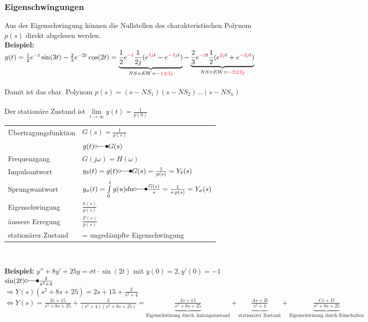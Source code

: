 		\subsubsection{Eigenschwingungen}
			Aus der Eigenschwingung können die Nullstellen des charakteristischen Polynom $p(s)$ 
			direkt abgelesen werden. \\
			\textbf{Beispiel:} \\
			$y(t) = \frac{1}{2} e^{-t} \sin(3t) - \frac{2}{3} e^{-2t} \cos(2t) = 
			\underbrace{\frac{1}{2} e^{\textcolor{red}{-t}} \frac{1}{2j}(e^{\textcolor{red}{3j}t}
			-e^{\textcolor{red}{-3j}t})}_{NS = EW = \textcolor{red}{-1 \pm 3j}} - 
			\underbrace{\frac{2}{3} e^{\textcolor{red}{-2}t} \frac{1}{2}(e^{\textcolor{red}{2j}t}
			+e^{\textcolor{red}{-2j}t})}_{NS = EW = \textcolor{red}{-2 \pm 2j}}$ \\\\
			Damit ist das char. Polynom $p(s) = (s-NS_1)(s-NS_2)\ldots(s-NS_n)$ \\\\
			Der stationäre Zustand ist $\lim\limits_{t\rightarrow\infty}y(t) = \frac{1}{p(0)}$ \\
				
		\renewcommand{\arraystretch}{2}
		\begin{tabular}{| l | l |}
			\hline
				Übertragungsfunktion & $G(s) = \frac{1}{p(s)}$\\
				& $g(t) \laplace G(s)$ \\
			\hline
				Frequenzgang & $G(j\omega) = H(\omega)$ \\
			\hline
				Impulsantwort & $y_{\delta}(t) = g(t) \laplace G(s) = \frac{1}{p(s)}=Y_{\delta}(s)$\\
			\hline
				Sprungwantwort & $y_{\sigma}(t)=\int\limits_0^t g(u) du \laplace \frac{G(s)}{s} = \frac{1}{s \cdot p(s)} = Y_{\sigma}(s)$\\
			\hline
				Eigenschwingung & $\frac{h(s)}{p(s)}$ \\
			\hline
				äussere Erregung & $\frac{F(s)}{p(s)}$ \\
			\hline
				stationärer Zustand & = ungedämpfte Eigenschwingung\\
			\hline
		\end{tabular}
		\renewcommand{\arraystretch}{\arraystretchOriginal}\\
		
		\begin{minipage}[l]{16cm}
				\textbf{Beispiel:} $y'' + 8y' + 25y = \sigma{t} \cdot \sin(2t)$ mit $y(0) = 2, y'(0) = -1$\\
				
				$\sin(2t) \laplace \frac{2}{s^2+4}$ \\
				
				$\Rightarrow Y(s)(s^2+8s+25) = 2s+15+\frac{2}{s^2+4}$\\
				
				$\Leftrightarrow Y(s) = \frac{2s+15}{s^2+8s+25}+\frac{2}{(s^2+4)(s^2+8s+25)}=
				\underbrace{\frac{2s+15}{s^2+8s+25}}_\text{Eigenschwinung durch Anfangszustand} +
				\underbrace{\frac{As + B}{s^2+4}}_\text{stationärer Zustand} +
				\underbrace{\frac{Cs + D}{s^2+8s+25}}_\text{Eigenschwinung durch Einschalten}$
		\end{minipage}

